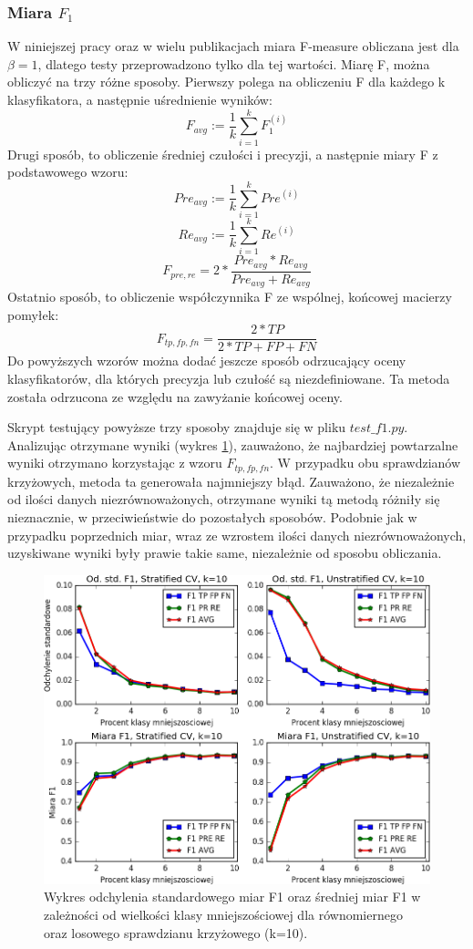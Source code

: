 \subsubsection{Miara $F_1$}
W niniejszej pracy oraz w wielu publikacjach miara F-measure obliczana jest dla $\beta=1$, dlatego testy przeprowadzono tylko dla tej wartości. Miarę F, można obliczyć na trzy różne sposoby. Pierwszy polega na obliczeniu F dla każdego k klasyfikatora, a następnie uśrednienie wyników:
\[F_{avg} := \frac{1}{k} \sum_{i=1}^{k} F_1^{(i)}\]
Drugi sposób, to obliczenie średniej czułości i precyzji, a następnie miary F z podstawowego wzoru:
\[Pre_{avg} := \frac{1}{k} \sum_{i=1}^{k} Pre^{(i)}\]
\[Re_{avg} := \frac{1}{k} \sum_{i=1}^{k} Re^{(i)}\]
\[F_{pre, re} = 2 * \frac{Pre_{avg}*Re_{avg}}{Pre_{avg}+Re_{avg}} \]
Ostatnio sposób, to obliczenie współczynnika F ze wspólnej, końcowej macierzy pomyłek:
\[F_{tp, fp, fn} = \frac{2*TP}{2*TP+FP+FN} \]
Do powyższych wzorów można dodać jeszcze sposób odrzucający oceny klasyfikatorów, dla których precyzja lub czułość są niezdefiniowane. Ta metoda została odrzucona ze względu na zawyżanie końcowej oceny. \par 
Skrypt testujący powyższe trzy sposoby znajduje się w pliku $test\_f1.py$. Analizując otrzymane wyniki (wykres \ref{fig:wykresf1}), zauważono, że najbardziej powtarzalne wyniki otrzymano korzystając z wzoru $F_{tp, fp, fn}$. W przypadku obu sprawdzianów krzyżowych, metoda ta generowała najmniejszy błąd. Zauważono, że niezależnie od ilości danych niezrównoważonych, otrzymane wyniki tą metodą różniły się nieznacznie, w przeciwieństwie do pozostałych sposobów. Podobnie jak w przypadku poprzednich miar, wraz ze wzrostem ilości danych niezrównoważonych, uzyskiwane wyniki były prawie takie same, niezależnie od sposobu obliczania.
\begin{figure}[H]
	\centering
	\includegraphics[width=\textwidth]{./images/miara-F1.png}
	\caption{Wykres odchylenia standardowego miar F1 oraz średniej miar F1 w zależności od wielkości klasy mniejszościowej dla równomiernego oraz losowego sprawdzianu krzyżowego (k=10).}
	\label{fig:wykresf1}
\end{figure}
